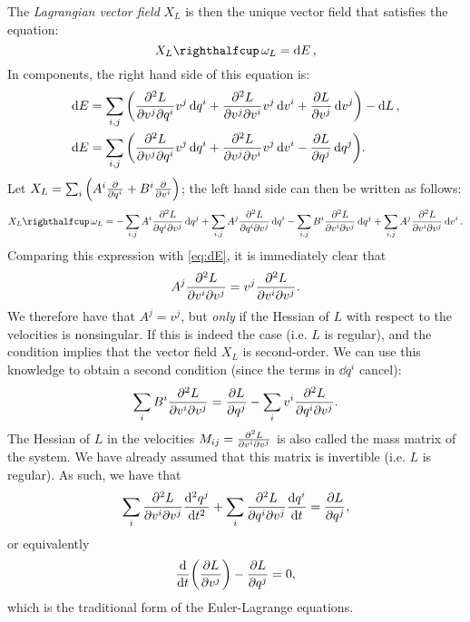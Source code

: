 The \emph{Lagrangian vector field} \(X_L\) is then the unique vector field that satisfies the equation: \cite{Godbillon1969}
\begin{equation}
    \intpr{X_L}{\omega_L} = \dd{E},
    \label{eq:EL_nocomp}
\end{equation}
In components, the right hand side of this equation is:
\begin{equation}
    \begin{split}
        \dd{E} &= \sum_{i, j}\qty(\pdv[2]{L}{v^j}{q^i}v^j\dd{q^i} + \pdv[2]{L}{v^j}{v^i}v^j\dd{v^i} + \pdv{L}{v^j}\dd{v^j}) - \dd{L}, \\
        \dd{E} &= \sum_{i, j}\qty(\pdv[2]{L}{v^j}{q^i}v^j\dd{q^i} + \pdv[2]{L}{v^j}{v^i}v^j\dd{v^i} - \pdv{L}{q^j}\dd{q^j}).
    \end{split}
    \label{eq:dE}
\end{equation}
Let \(X_L = \sum_i \qty( A^i \pdv{}{q^i} + B^i\pdv{}{v^i}) \); the left hand side can then be written as follows:
\begin{equation}
    \intpr{X_L}{\omega_L} =  - \sum_{i,j} A^i \pdv[2]{L}{q^i}{v^j}\dd{q^j} 
                             + \sum_{i,j} A^j \pdv[2]{L}{q^i}{v^j}\dd{q^i} 
                             - \sum_{i, j} B^i \pdv[2]{L}{v^i}{v^j}\dd{q^j}
                             + \sum_{i, j} A^j \pdv[2]{L}{v^i}{v^j}\dd{v^i}.
\end{equation}
Comparing this expression with \cref{eq:dE}, it is immediately clear that
\begin{equation}
     A^j \pdv[2]{L}{v^i}{v^j} = v^j \pdv[2]{L}{v^i}{v^j}.
\end{equation}
We therefore have that \(A^j = v^j\), but \emph{only} if the Hessian of \(L\) with respect to the velocities is nonsingular. If this is indeed the case (i.e. \(L\) is regular), and the condition implies that the vector field \(X_L\) is second-order. We can use this knowledge to obtain a second condition (since the terms in \(\dd{q^i}\) cancel): 
\begin{equation}
     \sum_{i} B^i \pdv[2]{L}{v^i}{v^j} = \pdv{L}{q^j} - \sum_{i} v^i \pdv[2]{L}{q^i}{v^j}.
\end{equation}
The Hessian of \(L\) in the velocities \(M_{ij} = \pdv[2]{L}{v^i}{v^j}\) is also called the mass matrix of the system. We have already assumed that this matrix is invertible (i.e. \(L\) is regular). As such, we have that
\begin{equation}
     \sum_{i}\pdv[2]{L}{v^i}{v^j}\dv[2]{q^j}{t} + \sum_{i} \pdv[2]{L}{q^i}{v^j}\dv{q^i}{t} = \pdv{L}{q^j},
\end{equation}
or equivalently
\begin{equation}
     \dv{}{t}\qty(\pdv{L}{v^j}) - \pdv{L}{q^j} = 0,
\end{equation}
which is the traditional form of the Euler-Lagrange equations.

